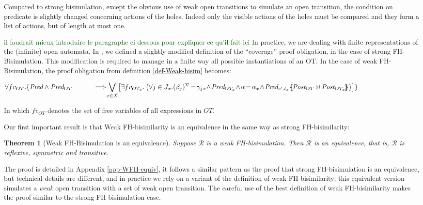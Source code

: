 \documentclass{lmcs}
\newcommand{\LUDO}[1]{\textcolor{darkgreen}{#1}}
\newtheorem{theorem}{Theorem}
\begin{document}
Compared to strong bisimulation, except the obvious use of weak open transitions to simulate an open transition, the condition on predicate is slightly changed concerning actions of the holes. Indeed only the visible actions of the holes must be compared and they form a list of actions, but of length at most one.

\LUDO{il faudrait mieux introduire le paragraphe ci dessous pour expliquer ce qu'il fait ici}
In practice, we are dealing with finite representations of the (infinite) open automata. In \cite{hou:hal-02406098}, we defined a slightly modified definition of the ``coverage'' proof obligation, in the case of strong FH-Bisimulation. This modification is required to manage in a finite way all possible instantiations of an OT. In the case of weak FH-Bisimulation, the proof obligation from definition \ref{def-Weak-bisim} becomes:
      
 $\forall fv_{OT}. \{ \Pred \land \Pred_{OT}\\
\hspace{1cm} \implies\!\!\! \displaystyle{\bigvee_{x\in X}\!
  \left[\exists fv_{OT_x}.\\
    \left( \forall j\in J_x. \vis{\beta_j}\!=\!\gamma_{jx}\! \land\! \Pred_{OT_x}
     \!\land\! \alpha\!=\!\alpha_x\! \land\!  
     \Pred_{s',t_x}\subst{\Post_{OT}\uplus\Post_{OT_x}}\right)\right]\}}$

In which $fv_{OT}$ denotes the set of free variables of all expressions in $OT$.

\medskip
Our first important result is that Weak FH-bisimilarity is an equivalence in the same way as strong FH-bisimilarity:


\begin{theorem}[Weak FH-Bisimulation is an equivalence]\label{thm-weak-equiv} Suppose $\mathcal{R}$ 
is a weak FH-bisimulation. Then $\mathcal{R}$ is an equivalence, that is, $\mathcal{R}$ is 
reflexive, symmetric and transitive.
\end{theorem}
The proof  is detailed in Appendix \ref{app-WFH-equiv}, it follows a similar pattern as the proof that strong FH-bisimulation is an equivalence, but technical details are different, and in practice we rely on a variant of the definition of weak FH-bisimilarity; this equivalent version simulates a \emph{weak} open transition with a set of weak open transition. The careful use of the best definition of weak FH-bisimilarity makes the proof similar to the strong FH-bisimulation case.
\end{document}

